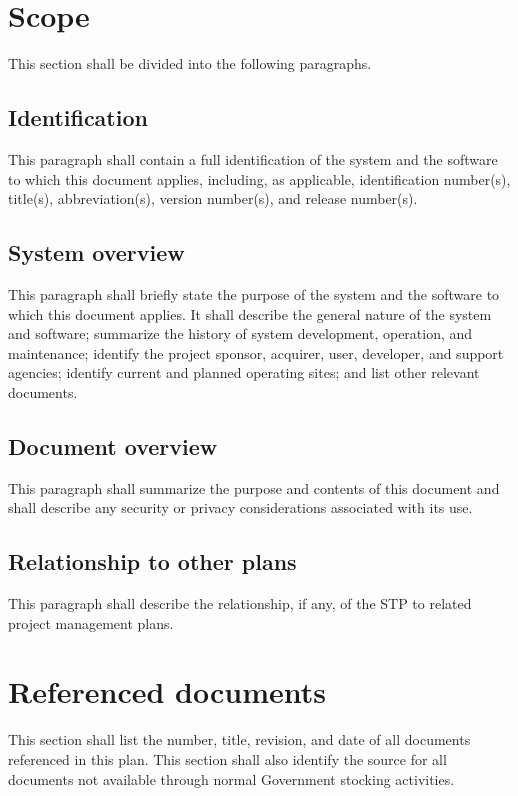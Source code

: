 \section{Scope}

This section shall be divided into the following paragraphs.

\subsection{Identification}

This paragraph shall contain a full identification of the system and the
software to which this document applies, including, as applicable,
identification number(s), title(s), abbreviation(s), version number(s),
and release number(s).

\subsection{System overview}

This paragraph shall briefly state the purpose of the system and the
software to which this document applies. It shall describe the general
nature of the system and software; summarize the history of system
development, operation, and maintenance; identify the project sponsor,
acquirer, user, developer, and support agencies; identify current and
planned operating sites; and list other relevant documents.

\subsection{Document overview}

This paragraph shall summarize the purpose and contents of this document
and shall describe any security or privacy considerations associated
with its use.

\subsection{Relationship to other plans}

This paragraph shall describe the relationship, if any, of the STP to
related project management plans.

\section{Referenced documents}

This section shall list the number, title, revision, and date of all
documents referenced in this plan. This section shall also identify the
source for all documents not available through normal Government
stocking activities.

